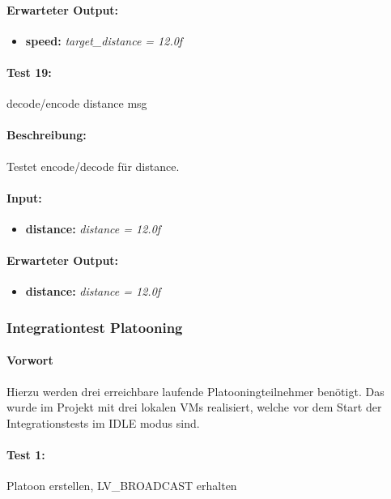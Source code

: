 \documentclass[a4paper, 12pt, titlepage]{scrartcl}
\begin{document}
{			\paragraph{Erwarteter Output:}
			\begin{itemize} \itemsep-0.5em
				\item \textbf{speed:} \emph{target\_distance = 12.0f}
			\end{itemize}

			\paragraph{Test 19:}{decode/encode distance msg}
			\paragraph{Beschreibung:} Testet encode/decode für distance.
			\paragraph{Input:}
			\begin{itemize} \itemsep-0.5em
				\item \textbf{distance:} \emph{distance = 12.0f}
			\end{itemize}
			\paragraph{Erwarteter Output:}
			\begin{itemize} \itemsep-0.5em
				\item \textbf{distance:} \emph{distance = 12.0f}
			\end{itemize}

		\subsubsection{Integrationtest Platooning}
			\label{integrationtest_platooning}

			\paragraph{Vorwort}
			Hierzu werden drei erreichbare laufende Platooningteilnehmer benötigt. Das wurde im Projekt mit drei lokalen VMs realisiert, welche vor dem Start der Integrationstests im IDLE modus sind.

			\paragraph{Test 1:}{Platoon erstellen, LV\_BROADCAST erhalten}
}
\end{document}
